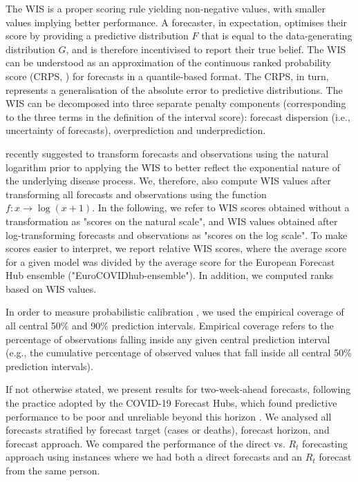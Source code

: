 \documentclass[10pt,a4paper,twocolumn]{article}
\begin{document}
The WIS is a proper scoring rule yielding non-negative values, with smaller values implying better performance. A forecaster, in expectation, optimises their score by providing a predictive distribution $F$ that is equal to the data-generating distribution $G$, and is therefore incentivised to report their true belief. The WIS can be understood as an approximation of the continuous ranked probability score (CRPS, \citealt{gneitingProbabilisticForecastsCalibration2007}) for forecasts in a quantile-based format. The CRPS, in turn, represents a generalisation of the absolute error to predictive distributions. The WIS can be decomposed into three separate penalty components (corresponding to the three terms in the definition of the interval score): forecast dispersion (i.e., uncertainty of forecasts), overprediction and underprediction. 

\citet{bosseTransformationForecastsEvaluating2023} recently suggested to transform forecasts and observations using the natural logarithm prior to applying the WIS to better reflect the exponential nature of the underlying disease process. We, therefore, also compute WIS values after transforming all forecasts and observations using the function $f\colon x \to \log (x + 1)$. In the following, we refer to WIS scores obtained without a transformation as "scores on the natural scale", and WIS values obtained after log-transforming forecasts and observations as "scores on the log scale". To make scores easier to interpret, we report relative WIS scores, where the average score for a given model was divided by the average score for the European Forecast Hub ensemble ("EuroCOVIDhub-ensemble"). In addition, we computed ranks based on WIS values. 

In order to measure probabilistic calibration \citep{gneitingProbabilisticForecastsCalibration2007}, we used the empirical coverage of all central 50\% and 90\% prediction intervals. Empirical coverage refers to the percentage of observations falling inside any given central prediction interval (e.g., the cumulative percentage of observed values that fall inside all central 50\% prediction intervals). 

If not otherwise stated, we present results for two-week-ahead forecasts, following the practice adopted by the COVID-19 Forecast Hubs, which found predictive performance to be poor and unreliable beyond this horizon \cite{cramerEvaluationIndividualEnsemble2021, sherrattPredictivePerformanceMultimodel2022, bracherShorttermForecastingCOVID192021}. We analysed all forecasts stratified by forecast target (cases or deaths), forecast horizon, and forecast approach. We compared the performance of the direct vs. $R_t$ forecasting approach using instances where we had both a direct forecasts and an $R_t$ forecast from the same person. 
\end{document}
